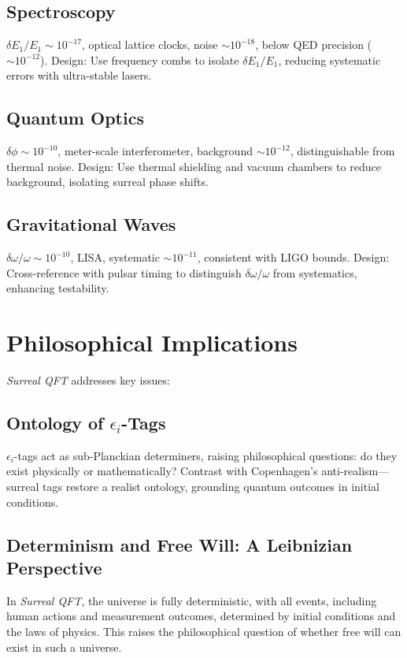 \documentclass{article}
\begin{document}
\subsection{Spectroscopy}
\(\delta E_1 / E_1 \sim 10^{-17}\), optical lattice clocks, noise \(\sim 10^{-18}\), below QED precision (\(\sim 10^{-12}\)). Design: Use frequency combs to isolate \(\delta E_1 / E_1\), reducing systematic errors with ultra-stable lasers.

\subsection{Quantum Optics}
\(\delta \phi \sim 10^{-10}\), meter-scale interferometer, background \(\sim 10^{-12}\), distinguishable from thermal noise. Design: Use thermal shielding and vacuum chambers to reduce background, isolating surreal phase shifts.

\subsection{Gravitational Waves}
\(\delta \omega / \omega \sim 10^{-10}\), LISA, systematic \(\sim 10^{-11}\), consistent with LIGO bounds. Design: Cross-reference with pulsar timing to distinguish \(\delta \omega / \omega\) from systematics, enhancing testability.

\section{Philosophical Implications}
\textit{Surreal QFT} addresses key issues:
\subsection{Ontology of \(\epsilon_i\)-Tags}
\(\epsilon_i\)-tags act as sub-Planckian determiners, raising philosophical questions: do they exist physically or mathematically? Contrast with Copenhagen's anti-realism---surreal tags restore a realist ontology, grounding quantum outcomes in initial conditions.

\subsection{Determinism and Free Will: A Leibnizian Perspective}
In \textit{Surreal QFT}, the universe is fully deterministic, with all events, including human actions and measurement outcomes, determined by initial conditions and the laws of physics. This raises the philosophical question of whether free will can exist in such a universe.
\end{document}
